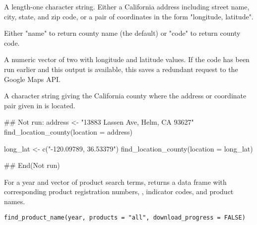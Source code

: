 \documentclass[a4paper]{book}
\begin{document}
%
\begin{Arguments}
\begin{ldescription}
\item[\code{location}] A length-one character string. Either a California address
including street name, city, state, and zip code, or a pair of coordinates
in the form "longitude, latitude".

\item[\code{return}] Either "name" to return county name (the default) or "code"
to return county code.

\item[\code{latlon\_out}] A numeric vector of two with longitude and latitude
values. If the  code has been run earlier and this output is
available, this saves a redundant request to the Google Maps API.
\end{ldescription}
\end{Arguments}
%
\begin{Value}
A character string giving the California county where the address or
coordinate pair given in  is located.
\end{Value}
%
\begin{Examples}
\begin{ExampleCode}
## Not run:
address <- "13883 Lassen Ave, Helm, CA 93627"
find_location_county(location = address)

long_lat <- c("-120.09789, 36.53379")
find_location_county(location = long_lat)

## End(Not run)
\end{ExampleCode}
\end{Examples}
%
\begin{Description}\relax
For a year and vector of product search terms,  returns
a data frame with corresponding product registration numbers, ,
indicator codes, and product names.
\end{Description}
%
\begin{Usage}
\begin{verbatim}
find_product_name(year, products = "all", download_progress = FALSE)
\end{verbatim}
\end{Usage}
%
\end{document}
